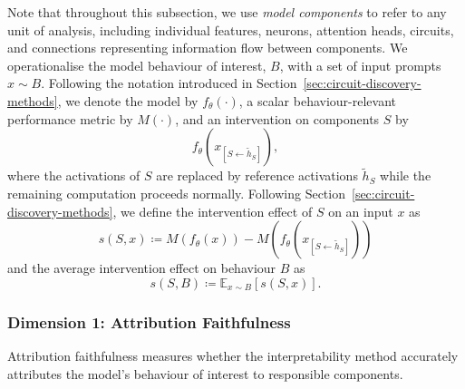 Note that throughout this subsection, we use \emph{model components} to refer to any unit of analysis, including individual features, neurons, attention heads, circuits, and connections representing information flow between components. We operationalise the model behaviour of interest, \(B\), with a set of input prompts \(x \sim B\). Following the notation introduced in Section~\ref{sec:circuit-discovery-methods}, we denote the model by \(f_\theta(\cdot)\), a scalar behaviour-relevant performance metric by \(M(\cdot)\), and an intervention on components \(S\) by
\[
f_\theta\!\left(x_{[S \leftarrow \tilde h_S]}\right),
\]
where the activations of \(S\) are replaced by reference activations \(\tilde h_S\) while the remaining computation proceeds normally. Following Section~\ref{sec:circuit-discovery-methods}, we define the intervention effect of \(S\) on an input \(x\) as
\[
s(S,x)
\coloneqq
M\!\left(f_\theta(x)\right)
-
M\!\left(
f_\theta\!\left(x_{[S \leftarrow \tilde h_S]}\right)
\right)
\]
and the average intervention effect on behaviour \(B\) as
\[
s(S,B)
\coloneqq
\mathbb{E}_{x \sim B}\left[s(S,x)\right].
\]

\subsubsection*{Dimension 1: Attribution Faithfulness}

Attribution faithfulness measures whether the interpretability method accurately attributes the model’s behaviour of interest to responsible components.


